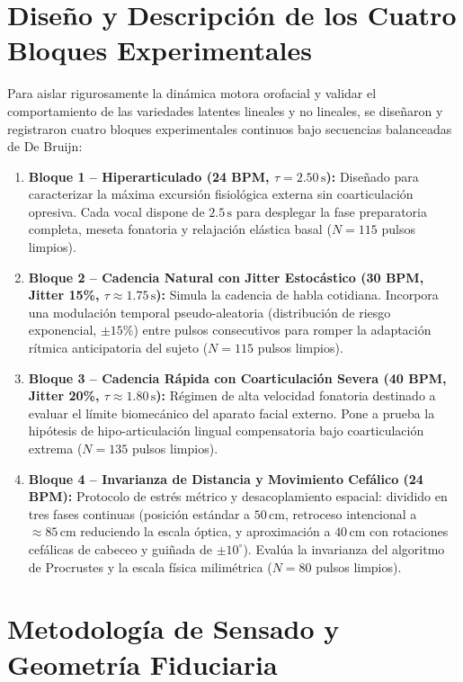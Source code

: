 \documentclass[11pt,a4paper]{report}
\begin{document}
\section{Diseño y Descripción de los Cuatro Bloques Experimentales}
Para aislar rigurosamente la dinámica motora orofacial y validar el comportamiento de las variedades latentes lineales y no lineales, se diseñaron y registraron cuatro bloques experimentales continuos bajo secuencias balanceadas de De Bruijn:
\begin{enumerate}
    \item \textbf{Bloque 1 -- Hiperarticulado (24 BPM, $\tau = 2.50\,\text{s}$):}
    Diseñado para caracterizar la máxima excursión fisiológica externa sin coarticulación opresiva. Cada vocal dispone de $2.5\,\text{s}$ para desplegar la fase preparatoria completa, meseta fonatoria y relajación elástica basal ($N=115$ pulsos limpios).
    \item \textbf{Bloque 2 -- Cadencia Natural con Jitter Estocástico (30 BPM, Jitter 15\%, $\tau \approx 1.75\,\text{s}$):}
    Simula la cadencia de habla cotidiana. Incorpora una modulación temporal pseudo-aleatoria (distribución de riesgo exponencial, $\pm 15\%$) entre pulsos consecutivos para romper la adaptación rítmica anticipatoria del sujeto ($N=115$ pulsos limpios).
    \item \textbf{Bloque 3 -- Cadencia Rápida con Coarticulación Severa (40 BPM, Jitter 20\%, $\tau \approx 1.80\,\text{s}$):}
    Régimen de alta velocidad fonatoria destinado a evaluar el límite biomecánico del aparato facial externo. Pone a prueba la hipótesis de hipo-articulación lingual compensatoria bajo coarticulación extrema ($N=135$ pulsos limpios).
    \item \textbf{Bloque 4 -- Invarianza de Distancia y Movimiento Cefálico (24 BPM):}
    Protocolo de estrés métrico y desacoplamiento espacial: dividido en tres fases continuas (posición estándar a $50\,\text{cm}$, retroceso intencional a $\approx 85\,\text{cm}$ reduciendo la escala óptica, y aproximación a $40\,\text{cm}$ con rotaciones cefálicas de cabeceo y guiñada de $\pm 10^\circ$). Evalúa la invarianza del algoritmo de Procrustes y la escala física milimétrica ($N=80$ pulsos limpios).
\end{enumerate}

\section{Metodología de Sensado y Geometría Fiduciaria}
\end{document}
